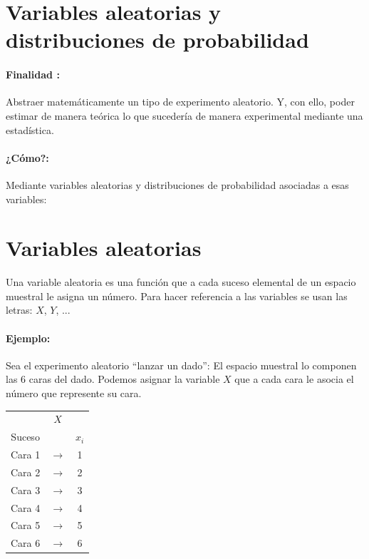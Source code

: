 \section{Variables aleatorias y distribuciones de probabilidad}

\paragraph{Finalidad :} Abstraer matemáticamente un tipo de experimento aleatorio. Y, con ello, poder estimar de manera teórica lo que sucedería de manera experimental mediante una estadística. 

\paragraph{¿Cómo?:} Mediante variables aleatorias y distribuciones de probabilidad asociadas a esas variables:

\section{Variables aleatorias} Una variable aleatoria es una función que a cada suceso
elemental de un espacio muestral le asigna un número. Para hacer referencia a las variables se usan las letras: $X$, $Y$, ...

\paragraph{Ejemplo:} Sea el experimento aleatorio “lanzar un dado”: El espacio muestral lo componen las 6 caras del dado. Podemos asignar la variable $X$ que a cada cara le asocia el número que represente su cara.

\begin{center}
\begin{tabular}{ccc}
 & $X$ &  \\
Suceso &  &  $x_i$\\ \hline 
Cara 1 & $\rightarrow$ & 1 \\ 
Cara 2 & $\rightarrow$ & 2 \\ 
Cara 3 & $\rightarrow$ & 3 \\ 
Cara 4 & $\rightarrow$ & 4 \\ 
Cara 5 & $\rightarrow$ & 5 \\ 
Cara 6 & $\rightarrow$ & 6 \\ 
\end{tabular} 
\end{center}

